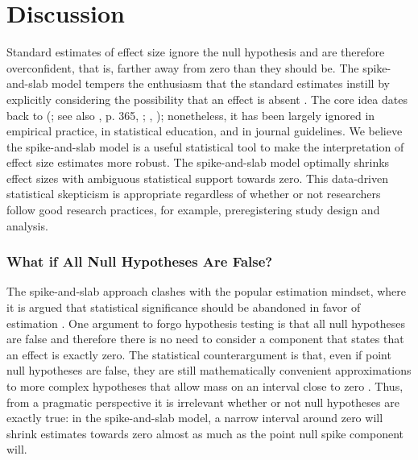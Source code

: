 \documentclass[a4paper]{article}
\newenvironment{revision}{\color{black}}{\color{black}}
\begin{document}
\section*{Discussion}
Standard estimates of effect size ignore the null hypothesis and are therefore overconfident, that is, \begin{revision}farther away\end{revision} from zero \begin{revision}than they should be\end{revision}. The spike-and-slab model \begin{revision} tempers the enthusiasm that the standard estimates instill\end{revision} by explicitly considering the possibility that an effect is absent \parencite{Robinson2019,RouderEtAl2018PBR}. The core idea dates back to
\citeauthor{Jeffreys1939} (\citeyear{Jeffreys1939}; see also \citeauthor{Jeffreys1961}, p. 365, \citeyear{Jeffreys1961}; \citeauthor{ly2020bayesian}, \citeyear{ly2020bayesian}); nonetheless, it \begin{revision}has been largely\end{revision} ignored in empirical practice, in statistical education, and in journal guidelines.
\begin{revision}%
We believe the spike-and-slab model is a useful statistical tool to make the interpretation of effect size estimates more robust. The spike-and-slab model optimally shrinks effect sizes with ambiguous statistical support towards zero. This data-driven statistical skepticism is appropriate regardless of whether or not researchers follow good research practices, for example, preregistering study design and analysis.
\end{revision}

\subsubsection*{What if All Null Hypotheses Are False?}
The spike-and-slab approach clashes with the popular estimation mindset, where it is argued that statistical significance should be abandoned in favor of estimation \parencite{McShane2019abandon, Cumming2016introduction, valentine2015life, Cumming2014}. 
One argument to forgo hypothesis testing is that all null hypotheses are false \parencite{Cohen1990, Meehl1978} and therefore there is no need to consider a component that states that an effect is exactly zero. 
The statistical counterargument is that, even if point null hypotheses are false, they are still mathematically convenient approximations to more complex hypotheses that allow mass on an interval close to zero \parencite[\begin{revision}i.e., perinull hypotheses;\end{revision}][]{ly2020bayesian2, george1993variable, BergerDelampady1987}. 
Thus, from a pragmatic perspective it is irrelevant whether or not null hypotheses are exactly true: in the spike-and-slab model, a \begin{revision}narrow interval around zero\end{revision} will shrink estimates towards zero almost as much as the point null spike component will. 
\end{document}
